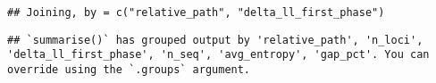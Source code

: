 \documentclass[
]{article}
\newenvironment{Shaded}{\begin{snugshade}}{\end{snugshade}}
\newcommand{\CommentTok}[1]{\textcolor[rgb]{0.56,0.35,0.01}{\textit{#1}}}
\newcommand{\DataTypeTok}[1]{\textcolor[rgb]{0.13,0.29,0.53}{#1}}
\newcommand{\KeywordTok}[1]{\textcolor[rgb]{0.13,0.29,0.53}{\textbf{#1}}}
\newcommand{\NormalTok}[1]{#1}
\newcommand{\OperatorTok}[1]{\textcolor[rgb]{0.81,0.36,0.00}{\textbf{#1}}}
\newcommand{\StringTok}[1]{\textcolor[rgb]{0.31,0.60,0.02}{#1}}
\begin{document}
\begin{Shaded}
\end{Shaded}

\begin{verbatim}
## Joining, by = c("relative_path", "delta_ll_first_phase")
\end{verbatim}

\begin{Shaded}
\end{Shaded}

\begin{verbatim}
## `summarise()` has grouped output by 'relative_path', 'n_loci', 'delta_ll_first_phase', 'n_seq', 'avg_entropy', 'gap_pct'. You can override using the `.groups` argument.
\end{verbatim}

\begin{Shaded}
\end{Shaded}
\end{document}
